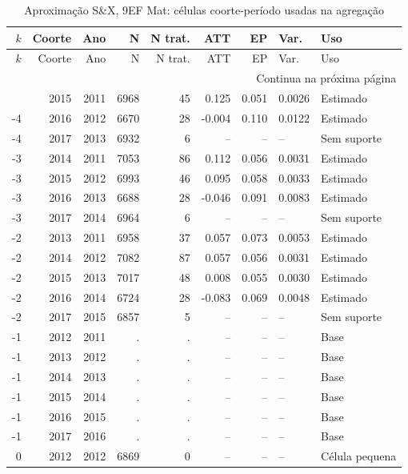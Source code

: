 \begingroup
\tiny
\setlength{\tabcolsep}{2.2pt}
\renewcommand{\arraystretch}{0.82}
\begin{longtable}{rrrrrrrll}
\caption{Aproximação S\&X, 9EF Mat: células coorte-período usadas na agregação}
\label{tab:ap_sx_celulas_9ef_mat}\\
\toprule
\(k\) & Coorte & Ano & N & N trat. & ATT & EP & Var. & Uso \\
\midrule
\endfirsthead
\toprule
\(k\) & Coorte & Ano & N & N trat. & ATT & EP & Var. & Uso \\
\midrule
\endhead
\midrule
\multicolumn{9}{r}{Continua na próxima página} \\
\endfoot
\bottomrule
\endlastfoot
-4 & 2015 & 2011 & 6968 & 45 & 0.125 & 0.051 & 0.0026 & Estimado \\
-4 & 2016 & 2012 & 6670 & 28 & -0.004 & 0.110 & 0.0122 & Estimado \\
-4 & 2017 & 2013 & 6932 & 6 & -- & -- & -- & Sem suporte \\
-3 & 2014 & 2011 & 7053 & 86 & 0.112 & 0.056 & 0.0031 & Estimado \\
-3 & 2015 & 2012 & 6993 & 46 & 0.095 & 0.058 & 0.0033 & Estimado \\
-3 & 2016 & 2013 & 6688 & 28 & -0.046 & 0.091 & 0.0083 & Estimado \\
-3 & 2017 & 2014 & 6964 & 6 & -- & -- & -- & Sem suporte \\
-2 & 2013 & 2011 & 6958 & 37 & 0.057 & 0.073 & 0.0053 & Estimado \\
-2 & 2014 & 2012 & 7082 & 87 & 0.057 & 0.056 & 0.0031 & Estimado \\
-2 & 2015 & 2013 & 7017 & 48 & 0.008 & 0.055 & 0.0030 & Estimado \\
-2 & 2016 & 2014 & 6724 & 28 & -0.083 & 0.069 & 0.0048 & Estimado \\
-2 & 2017 & 2015 & 6857 & 5 & -- & -- & -- & Sem suporte \\
-1 & 2012 & 2011 & . & . & -- & -- & -- & Base \\
-1 & 2013 & 2012 & . & . & -- & -- & -- & Base \\
-1 & 2014 & 2013 & . & . & -- & -- & -- & Base \\
-1 & 2015 & 2014 & . & . & -- & -- & -- & Base \\
-1 & 2016 & 2015 & . & . & -- & -- & -- & Base \\
-1 & 2017 & 2016 & . & . & -- & -- & -- & Base \\
0 & 2012 & 2012 & 6869 & 0 & -- & -- & -- & Célula pequena \\

\end{longtable}
